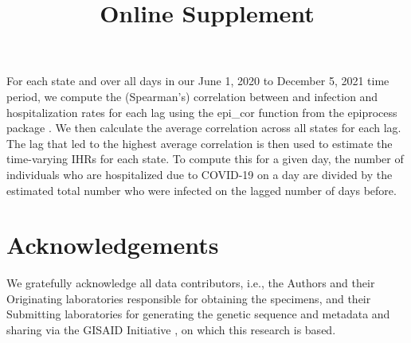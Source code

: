 \documentclass{article}
\newcommand{\beginsupplement}{
  \setcounter{table}{1}  
  \renewcommand{\thetable}{S\arabic{table}} 
  \setcounter{figure}{1} 
  \renewcommand{\thefigure}{S\arabic{figure}}
  \setcounter{section}{0} 
  \renewcommand{\thesection}{S\arabic{section}}
}
\begin{document}
For each state and over all days in our June 1, 2020 to December 5, 2021 time period, we compute the (Spearman’s) correlation between and infection and hospitalization rates for each lag using the epi\_cor function from the epiprocess package \citep{brooks2023epiprocess}. We then calculate the average correlation across all states for each lag. The lag that led to the highest average correlation is then used to estimate the time-varying IHRs for each state. To compute this for a given day, the number of individuals who are hospitalized due to COVID-19 on a day are divided by the estimated total number who were infected on the lagged number of days before.



\section{Acknowledgements}

We gratefully acknowledge all data contributors, i.e., the Authors and their Originating laboratories responsible for obtaining the specimens, and their Submitting laboratories for generating the genetic sequence and metadata and sharing via the GISAID Initiative \citep{elbe2017data}, on which this research is based.



\newpage


\newpage
\beginsupplement
\title{Online Supplement} 
\maketitle
\end{document}
